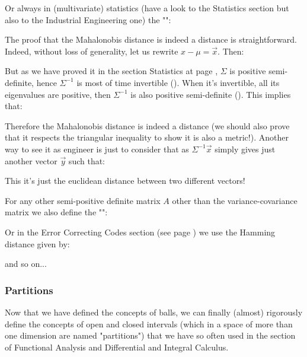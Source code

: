 	Or always in (multivariate) statistics (have a look to the Statistics section but also to the Industrial Engineering one) the ""\label{Mahalanobis distance}:
	
	\begin{tcolorbox}[title=Remarks,arc=10pt,breakable,drop lifted shadow,
  skin=enhanced,
  skin first is subskin of={enhancedfirst}{arc=10pt,no shadow},
  skin middle is subskin of={enhancedmiddle}{arc=10pt,no shadow},
  skin last is subskin of={enhancedlast}{drop lifted shadow}]
	The proof that the Mahalonobis distance is indeed a distance is straightforward. Indeed, without loss of generality, let us rewrite $x-\mu=\vec{x}$. Then:
	
	But as we have proved it in the section Statistics at page \pageref{positive semi-definitiveness of covariance matrix}, $\Sigma$ is positive semi-definite, hence $\Sigma^{-1}$ is most of time invertible (). When it's invertible, all its eigenvalues are positive, then $\Sigma^{-1}$ is also positive semi-definite (). This implies that:
	
	Therefore the Mahalonobis distance is indeed a distance (we should also prove that it respects the triangular inequality to show it is also a metric!). Another way to see it as engineer is just to consider that as $\Sigma^{-1}\vec{x}$ simply gives just another vector $\vec{y}$ such that:
	
	This it's just the euclidean distance between two different vectors!
	\end{tcolorbox}	
	For any other semi-positive definite matrix $A$ other than the variance-covariance matrix we also define the ""\label{elliptic metric}:
	
	
	Or in the Error Correcting Codes section (see page \pageref{Hamming distance}) we use the Hamming distance given by:
	
	and so on...
	
	\subsubsection{Partitions}
	Now that we have defined the concepts of balls, we can finally (almost) rigorously define the concepts of open and closed intervals (which in a space of more than one dimension are named "partitions") that we have so often used in the section of Functional Analysis and Differential and Integral Calculus.
	
